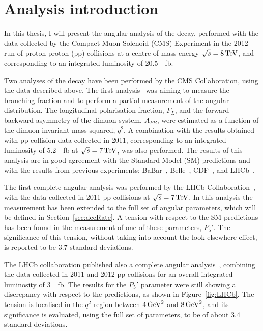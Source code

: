 \chapter{Analysis introduction}
\label{sec:theo}

In this thesis, I will present the angular analysis of the \BtoKstmumu decay, performed with the data collected by the Compact Muon Solenoid (CMS) Experiment in the 2012 run of proton-proton (pp) collisions at a centre-of-mass energy $\sqrt{s}=8\,\textrm{TeV}$, and corresponding to an integrated luminosity of \SI{20.5}{\per\femto\barn}.

Two analyses of the \BtoKstmumu decay have been performed by the CMS Collaboration, using the data described above.
The first analysis~\cite{CMS:2012} was aiming to measure the branching fraction and to perform a partial measurement of the angular distribution.
The \Ks longitudinal polarisation fraction, $F_L$, and the forward-backward asymmetry of the dimuon system, $A_{FB}$, were estimated as a function of the dimuon invariant mass squared, $q^2$.
A combination with the results obtained with pp collision data collected in 2011, corresponding to an integrated luminosity of \SI{5.2}{\per\femto\barn} at $\sqrt{s}=7\,\textrm{TeV}$, was also performed.
The results of this analysis are in good agreement with the Standard Model (SM) predictions and with the results from previous experiments: BaBar~\cite{Aubert:2008bi}, Belle~\cite{Wei:2009zv}, CDF~\cite{Aaltonen:2011ja}, and LHCb~\cite{Aaij:2013iag}.

The first complete angular analysis was performed by the LHCb Collaboration~\cite{Aaij:2013qta}, with the data collected in 2011 pp collisions at $\sqrt{s}=7\,\textrm{TeV}$.
In this analysis the measurement has been extended to the full set of angular parameters, which will be defined in Section~\ref{sec:decRate}.
A tension with respect to the SM predictions has been found in the measurement of one of these parameters, $P_5'$.
The significance of this tension, without taking into account the look-elsewhere effect, is reported to be 3.7 standard deviations.

The LHCb collaboration published also a complete angular analysis~\cite{Aaij:2015oid}, combining the data collected in 2011 and 2012 pp collisions for an overall integrated luminosity of \SI{3}{\per\femto\barn}.
The results for the $P_5'$ parameter were still showing a discrepancy with respect to the predictions, as shown in Figure~\ref{fig:LHCb}.
The tension is localised in the $q^2$ region between $4\,\textrm{GeV}^2$ and $8\,\textrm{GeV}^2$, and its significance is evaluated, using the full set of parameters, to be of about 3.4 standard deviations.


